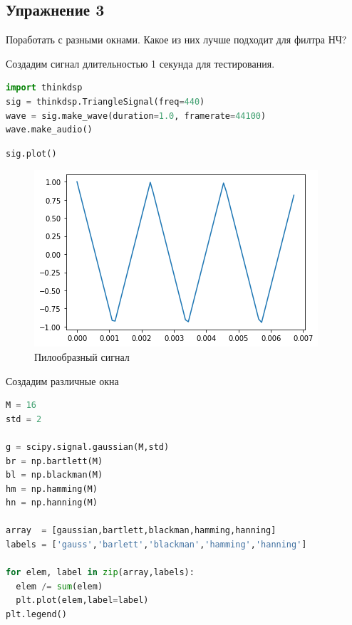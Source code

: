 \subsection{Упражнение 3}

Поработать с разными окнами. Какое из них лучше подходит для филтра НЧ?

Создадим сигнал длительностью 1 секунда для тестирования.

\begin{lstlisting}[language=Python]
import thinkdsp
sig = thinkdsp.TriangleSignal(freq=440)
wave = sig.make_wave(duration=1.0, framerate=44100)
wave.make_audio()
\end{lstlisting}

\begin{lstlisting}[language=Python]
sig.plot()
\end{lstlisting}

\begin{figure}[H]
	\begin{center}
		\includegraphics[scale=1]{fig/lab08/lab08_7.png}
		\caption{Пилообразный сигнал}
	\end{center}
\end{figure}

Создадим различные окна


\begin{lstlisting}[language=Python]
M = 16
std = 2

g = scipy.signal.gaussian(M,std)
br = np.bartlett(M)
bl = np.blackman(M)
hm = np.hamming(M)
hn = np.hanning(M)

array  = [gaussian,bartlett,blackman,hamming,hanning]
labels = ['gauss','barlett','blackman','hamming','hanning']

for elem, label in zip(array,labels):
  elem /= sum(elem)
  plt.plot(elem,label=label)
plt.legend()
\end{lstlisting}

